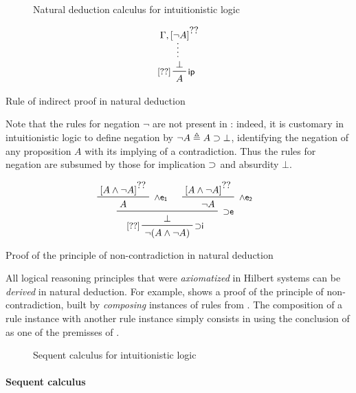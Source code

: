 \begin{figure*}
  
  \caption{Natural deduction calculus  for intuitionistic logic}
\end{figure*}

\begin{marginfigure}
  $$
  \prftree[r][l]{\rsf{ip}}{\small[\prfref<H1>]}
  {\summ
    {\Gamma, \prfboundedassumption<H1>{\neg A}}
    {\bot}}
  {A}    
  $$
  \caption{Rule of indirect proof in natural deduction}
\end{marginfigure}

\begin{remark}
  Note that the rules for negation $\neg$ are not present in
  : indeed, it is customary in intuitionistic logic to define
  negation by $\neg A \triangleq A \supset \bot$, identifying the negation of any
  proposition $A$ with its implying of a contradiction. Thus the rules for
  negation are subsumed by those for implication $\supset$ and absurdity $\bot$.
\end{remark}

\begin{marginfigure}
  $$
  \prftree[r][l]{\rsf{{\limp}i}}{\small[\prfref<H1>]}
    {\R[\rsf{{\limp}e}]
      {\R[\rsf{\land e_1}]
        {\prfboundedassumption<H1>{A \land \neg A}}
        {A}}
      {\R[\rsf{\land e_2}]
        {\prfboundedassumption<H1>{A \land \neg A}}
        {\neg A}}
      {\bot}}
    {\neg (A \land \neg A)}
  $$
  \caption{Proof of the principle of non-contradiction in natural deduction}
\end{marginfigure}

All logical reasoning principles that were \emph{axiomatized} in Hilbert systems
can be \emph{derived} in natural deduction. For example,  shows a
proof of the principle of non-contradiction, built by \emph{composing} instances
of rules from . The composition of a rule instance 
with another rule instance  simply consists in using the conclusion of
 as one of the premisses of .

\begin{figure*}
  
  \caption{Sequent calculus  for intuitionistic logic}
\end{figure*}

\paragraph{Sequent calculus}

